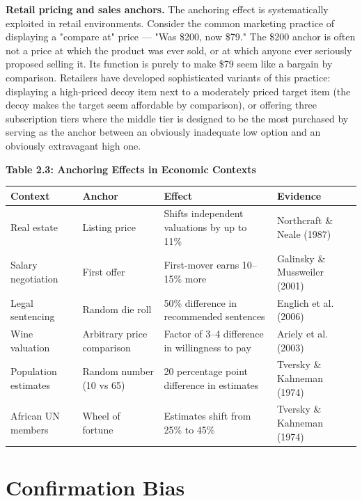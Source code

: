 \documentclass[12pt, letterpaper]{article}
\begin{document}
\textbf{Retail pricing and sales anchors.} The anchoring effect is systematically exploited in retail environments. Consider the common marketing practice of displaying a "compare at" price --- "Was \$200, now \$79." The \$200 anchor is often not a price at which the product was ever sold, or at which anyone ever seriously proposed selling it. Its function is purely to make \$79 seem like a bargain by comparison. Retailers have developed sophisticated variants of this practice: displaying a high-priced decoy item next to a moderately priced target item (the decoy makes the target seem affordable by comparison), or offering three subscription tiers where the middle tier is designed to be the most purchased by serving as the anchor between an obviously inadequate low option and an obviously extravagant high one.

\textbf{Table 2.3: Anchoring Effects in Economic Contexts}


\begin{table}[H]
\centering
\small
\begin{tabularx}{\linewidth}{lYYY}
\toprule
Context & Anchor & Effect & Evidence \\
\midrule
Real estate & Listing price & Shifts independent valuations by up to 11\% & Northcraft \& Neale (1987) \\
Salary negotiation & First offer & First-mover earns 10--15\% more & Galinsky \& Mussweiler (2001) \\
Legal sentencing & Random die roll & 50\% difference in recommended sentences & Englich et al. (2006) \\
Wine valuation & Arbitrary price comparison & Factor of 3--4 difference in willingness to pay & Ariely et al. (2003) \\
Population estimates & Random number (10 vs 65) & 20 percentage point difference in estimates & Tversky \& Kahneman (1974) \\
African UN members & Wheel of fortune & Estimates shift from 25\% to 45\% & Tversky \& Kahneman (1974) \\
\bottomrule
\end{tabularx}
\end{table}


\medskip


\section{Confirmation Bias}
\end{document}

